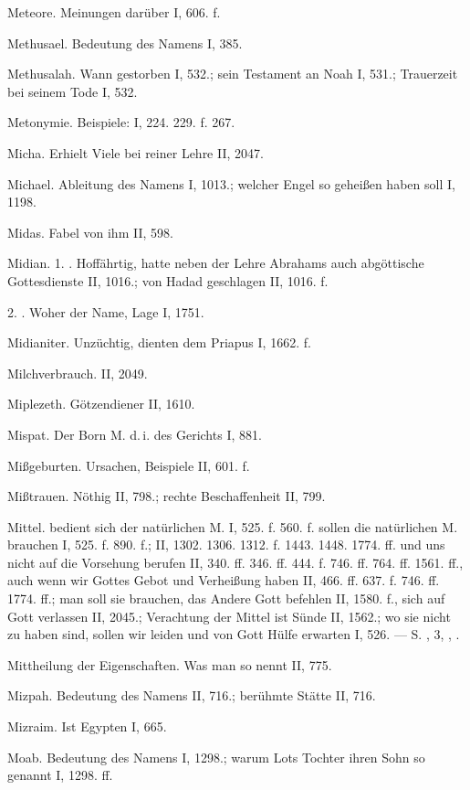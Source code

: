 Meteore. Meinungen darüber I, 606. f.

Methusael. Bedeutung des Namens I, 385.

Methusalah. Wann gestorben I, 532.; sein Testament an Noah I, 531.; Trauerzeit bei seinem Tode I, 532.

Metonymie. Beispiele: I, 224. 229. f. 267.

Micha. Erhielt Viele bei reiner Lehre II, 2047.

Michael. Ableitung des Namens I, 1013.; welcher Engel so geheißen haben soll I, 1198.

Midas. Fabel von ihm II, 598.

Midian. 1. . Hoffährtig, hatte neben der Lehre Abrahams auch abgöttische Gottesdienste II, 1016.; von Hadad geschlagen II, 1016. f.

2. . Woher der Name, Lage I, 1751.

Midianiter. Unzüchtig, dienten dem Priapus I, 1662. f.

Milchverbrauch. II, 2049.

Miplezeth. Götzendiener II, 1610.

Mispat. Der Born M. d.\,i. des Gerichts I, 881.

Mißgeburten. Ursachen, Beispiele II, 601. f.

Mißtrauen. Nöthig II, 798.; rechte Beschaffenheit II, 799.

Mittel.  bedient sich der natürlichen M. I, 525. f. 560. f.  sollen die natürlichen M. brauchen I, 525. f. 890. f.; II, 1302. 1306. 1312. f. 1443. 1448. 1774. ff. und uns nicht auf die Vorsehung berufen II, 340. ff. 346. ff. 444. f. 746. ff. 764. ff. 1561. ff., auch wenn wir Gottes Gebot und Verheißung haben II, 466. ff. 637. f. 746. ff. 1774. ff.; man soll sie brauchen, das Andere Gott befehlen II, 1580. f., sich auf Gott verlassen II, 2045.; Verachtung der Mittel ist Sünde II, 1562.; wo sie nicht zu haben sind, sollen wir leiden und von Gott Hülfe erwarten I, 526. — S. ,  3, , .

Mittheilung der Eigenschaften. Was man so nennt II, 775.

Mizpah. Bedeutung des Namens II, 716.; berühmte Stätte II, 716.

Mizraim. Ist Egypten I, 665.

Moab. Bedeutung des Namens I, 1298.; warum Lots Tochter ihren Sohn so genannt I, 1298. ff.

